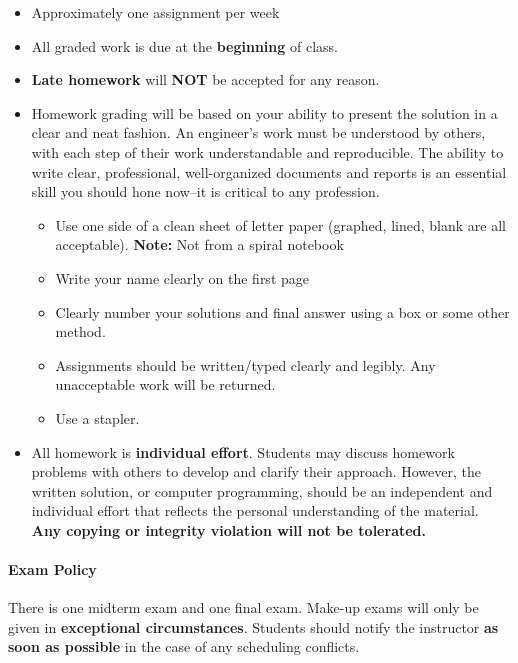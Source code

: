 \documentclass[11pt, reqno]{article}   	%
\begin{document}
\begin{itemize}
    \item Approximately one assignment per week
    \item All graded work is due at the \textbf{beginning} of class.
    \item \textbf{Late homework} will \textbf{NOT} be accepted for any reason.
    \item Homework grading will be based on your ability to present the solution in a clear and neat fashion.
    An engineer's work must be understood by others, with each step of their work understandable and reproducible. 
    The ability to write clear, professional, well-organized documents and reports is an essential skill you should hone now--it is critical to any profession.
    \begin{itemize}
        \item Use one side of a clean sheet of letter paper (graphed, lined, blank are all acceptable).
        \textbf{Note:} Not from a spiral notebook
        \item Write your name clearly on the first page
        \item Clearly number your solutions and final answer using a box or some other method.
        \item Assignments should be written/typed clearly and legibly. 
        Any unacceptable work will be returned.
        \item Use a stapler.
    \end{itemize}
    \item All homework is \textbf{individual effort}.
    Students may discuss homework problems with others to develop and clarify their approach.
    However, the written solution, or computer programming, should be an independent and individual effort that reflects the personal understanding of the material.
    \textbf{Any copying or integrity violation will not be tolerated.}
\end{itemize}

\paragraph{Exam Policy}
There is one midterm exam and one final exam. 
Make-up exams will only be given in \textbf{exceptional circumstances}.
Students should notify the instructor \textbf{as soon as possible} in the case of any scheduling conflicts.
\end{document}
